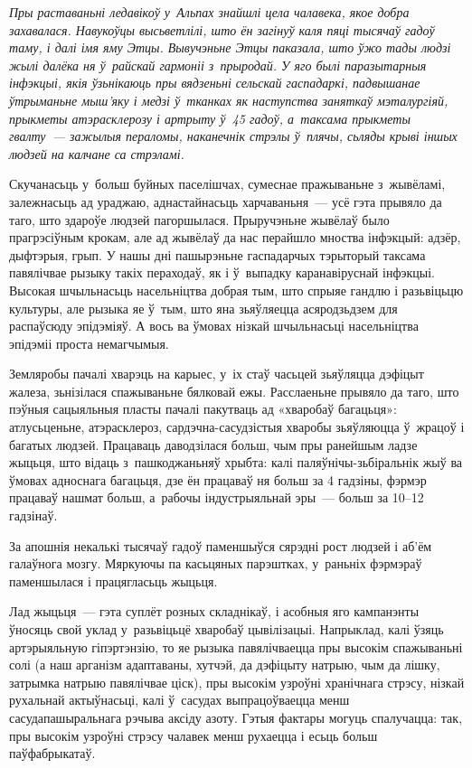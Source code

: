 \emph{Пры раставаньні ледавікоў у~Альпах знайшлі цела чалавека, якое добра захавалася. Навукоўцы высьветлілі, што ён загінуў каля пяці тысячаў гадоў таму, і далі імя яму Этцы. Вывучэньне Этцы паказала, што ўжо тады людзі жылі далёка ня ў~райскай гармоніі з~прыродай. У яго былі паразытарныя інфэкцыі, якія ўзьнікаюць пры вядзеньні сельскай гаспадаркі, падвышанае ўтрыманьне мыш'яку і медзі ў~тканках як наступства заняткаў мэталургіяй, прыкметы атэрасклерозу і артрыту ў~45 гадоў, а~таксама прыкметы гвалту~--- зажылыя пераломы, наканечнік стрэлы ў~плячы, сьляды крыві іншых людзей на калчане са стрэламі.}

Скучанасьць у~больш буйных паселішчах, сумеснае пражываньне з~жывёламі, залежнасьць ад ураджаю, аднастайнасьць харчаваньня~--- усё гэта прывяло да таго, што здароўе людзей пагоршылася. Прыручэньне жывёлаў было прагрэсіўным крокам, але ад жывёлаў да нас перайшло мноства інфэкцый: адзёр, дыфтэрыя, грып. У нашы дні пашырэньне гаспадарчых тэрыторый таксама павялічвае рызыку такіх пераходаў, як і ў~выпадку каранавіруснай інфэкцыі. Высокая шчыльнасьць насельніцтва добрая тым, што спрыяе гандлю і разьвіцьцю культуры, але рызыка яе ў~тым, што яна зьяўляецца асяродзьдзем для распаўсюду эпідэміяў. А вось ва ўмовах нізкай шчыльнасьці насельніцтва эпідэміі проста немагчымыя.

Земляробы пачалі хварэць на карыес, у~іх стаў часьцей зьяўляцца дэфіцыт жалеза, зьнізілася спажываньне бялковай ежы. Расслаеньне прывяло да таго, што пэўныя сацыяльныя пласты пачалі пакутваць ад «хваробаў багацьця»: атлусьценьне, атэрасклероз, сардэчна-сасудзістыя хваробы зьяўляюцца ў~жрацоў і багатых людзей. Працаваць даводзілася больш, чым пры ранейшым ладзе жыцьця, што відаць з~пашкоджаньняў хрыбта: калі паляўнічы-зьбіральнік жыў ва ўмовах адноснага багацьця, дзе ён працаваў ня больш за 4 гадзіны, фэрмэр працаваў нашмат больш, а~рабочы індустрыяльнай эры~--- больш за 10--12 гадзінаў.

За апошнія некалькі тысячаў гадоў паменшыўся сярэдні рост людзей і аб'ём галаўнога мозгу. Мяркуючы па касьцяных парэштках, у~раньніх фэрмэраў паменшылася і працягласьць жыцьця.


Лад жыцьця~--- гэта суплёт розных складнікаў, і асобныя яго кампанэнты ўносяць свой уклад у~разьвіцьцё хваробаў цывілізацыі. Напрыклад, калі ўзяць артэрыяльную гіпэртэнзію, то яе рызыка павялічваецца пры высокім спажываньні солі (а наш арганізм адаптаваны, хутчэй, да дэфіцыту натрыю, чым да лішку, затрымка натрыю павялічвае ціск), пры высокім узроўні хранічнага стрэсу, нізкай рухальнай актыўнасьці, калі ў~сасудах выпрацоўваецца менш сасудапашыральнага рэчыва аксіду азоту. Гэтыя фактары могуць спалучацца: так, пры высокім узроўні стрэсу чалавек менш рухаецца і есьць больш паўфабрыкатаў.

